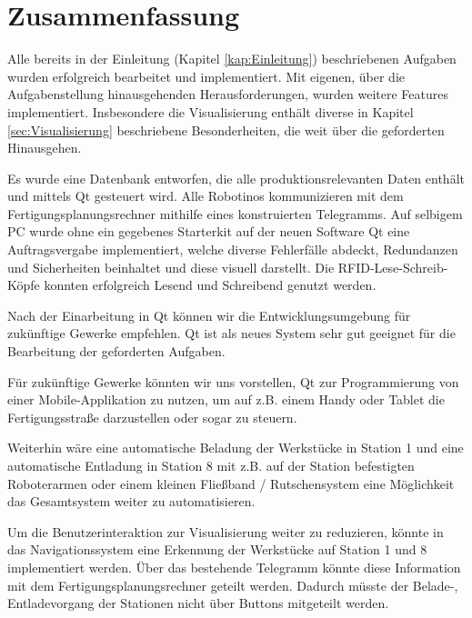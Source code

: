 
\chapter{Zusammenfassung}
\label{sec:Fazit}

Alle bereits in der Einleitung (Kapitel \ref{kap:Einleitung}) beschriebenen Aufgaben wurden erfolgreich bearbeitet und implementiert. Mit eigenen, über die Aufgabenstellung hinausgehenden Herausforderungen, wurden weitere Features implementiert. Insbesondere die Visualisierung enthält diverse in Kapitel \ref{sec:Visualisierung} beschriebene Besonderheiten, die weit über die geforderten Hinausgehen. 

Es wurde eine Datenbank entworfen, die alle produktionsrelevanten Daten enthält und mittels Qt gesteuert wird. Alle Robotinos kommunizieren mit dem Fertigungsplanungsrechner mithilfe eines konstruierten Telegramms. Auf selbigem PC wurde ohne ein gegebenes Starterkit auf der neuen Software Qt eine Auftragsvergabe implementiert, welche diverse Fehlerfälle abdeckt, Redundanzen und Sicherheiten beinhaltet und diese visuell darstellt. Die RFID-Lese-Schreib-Köpfe konnten erfolgreich Lesend und Schreibend genutzt werden. 

Nach der Einarbeitung in Qt können wir die Entwicklungsumgebung für zukünftige Gewerke empfehlen. Qt ist als neues System sehr gut geeignet für die Bearbeitung der geforderten Aufgaben.

Für zukünftige Gewerke könnten wir uns vorstellen, Qt zur Programmierung von einer Mobile-Applikation zu nutzen, um auf z.B. einem Handy oder Tablet die Fertigungsstraße darzustellen oder sogar zu steuern. 

Weiterhin wäre eine automatische Beladung der Werkstücke in Station 1 und eine automatische Entladung in Station 8 mit z.B. auf der Station befestigten Roboterarmen oder einem kleinen Fließband / Rutschensystem eine Möglichkeit das Gesamtsystem weiter zu automatisieren. 

Um die Benutzerinteraktion zur Visualisierung weiter zu reduzieren, könnte in das Navigationssystem eine Erkennung der Werkstücke auf Station 1 und 8 implementiert werden. Über das bestehende Telegramm könnte diese Information mit dem Fertigungsplanungsrechner geteilt werden. Dadurch müsste der Belade-, Entladevorgang der Stationen nicht über Buttons mitgeteilt werden. 